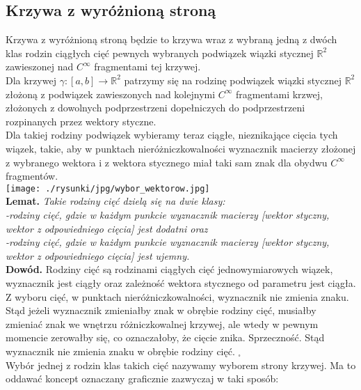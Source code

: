 \documentclass[a4paper, 12pt, twosided]{article}
\newcommand{\todo}[1]{\hfill \break \textbf{\Huge \textcolor{violet}{TO DO: #1} \hfill \break}
\normalsize}
\newcommand{\smalltodoII}[1]{\hfill \break \textbf{\ \textcolor{violet}{To do: #1}}\hfill \break}
\newcommand{\rysunek}[1]{\hfill \break\\[16pt] \Huge \textbf{\textcolor{violet}{Brakujący rysunek 
\normalsize
#1}} \hfill
\break \\[16pt] \normalsize}
\begin{document}
\subsection{Krzywa z wyróżnioną stroną}
Krzywa z wyróżnioną stroną będzie to krzywa wraz z wybraną jedną z dwóch klas rodzin ciągłych cięć 
 pewnych wybranych
 podwiązek wiązki stycznej $\mathbb{R}^2$ zawieszonej nad $C^\infty$ fragmentami tej krzywej. \\
Dla krzywej $\gamma : [a, b] \to \mathbb{R}^2$ patrzymy się na rodzinę podwiązek wiązki stycznej
$\mathbb{R}^2$ złożoną z podwiązek zawieszonych nad kolejnymi  
$C^\infty$ fragmentami krzwej, złożonych
z dowolnych podprzestrzeni dopełniczych do podprzestrzeni rozpinanych przez wektory styczne.
\\
Dla takiej rodziny podwiązek wybieramy teraz ciągłe, nieznikające cięcia tych wiązek, 
takie, aby w punktach nieróżniczkowalności
wyznacznik macierzy złożonej z wybranego wektora i z wektora stycznego miał taki sam znak dla obydwu
$C^\infty$ fragmentów. \\
\texttt{[image: ./rysunki/jpg/wybor\_wektorow.jpg]} \\
\textbf{Lemat.} 
\textit{Takie rodziny cięć dzielą się na dwie klasy: \\
-rodziny cięć, gdzie w każdym punkcie wyznacznik macierzy [wektor styczny, wektor z odpowiedniego 
cięcia] jest dodatni 
oraz\\
-rodziny cięć, gdzie w każdym punkcie wyznacznik macierzy [wektor styczny, wektor z odpowiedniego 
cięcia] jest ujemny. \\}
\textbf{Dowód.}
Rodziny cięć są rodzinami ciągłych cięć jednowymiarowych wiązek, wyznacznik jest ciągły oraz
zależność wektora stycznego od parametru jest ciągła. Z wyboru cięć, w punktach 
nieróżniczkowalności, wyznacznik nie zmienia znaku. Stąd jeżeli wyznacznik zmieniałby znak w 
 obrębie 
rodziny cięć, 
musiałby zmieniać znak we wnętrzu
różniczkowalnej krzywej, ale wtedy w pewnym momencie zerowałby się, co oznaczałoby, że cięcie znika.
Sprzeczność. Stąd wyznacznik nie zmienia znaku w obrębie rodziny cięć. $_\square$\\
Wybór jednej z rodzin klas takich cięć nazywamy wyborem strony krzywej. Ma to oddawać 
koncept oznaczany graficznie zazwyczaj w taki sposób: \\
\end{document}

